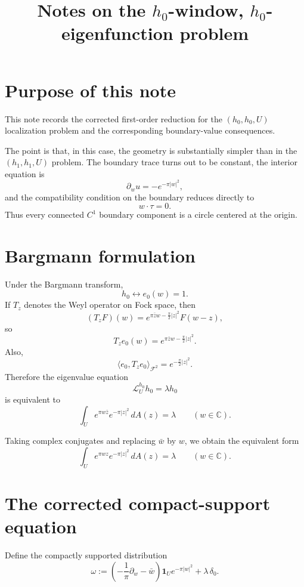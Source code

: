 \documentclass[11pt]{article}
\title{Notes on the \(h_0\)-window, \(h_0\)-eigenfunction problem}
\author{}
\date{}
\newcommand{\C}{\mathbb C}
\newcommand{\1}{\mathbf 1}
\newcommand{\pw}{\partial_w}
\begin{document}
\maketitle

\section{Purpose of this note}

This note records the corrected first-order reduction for the \((h_0,h_0,U)\) localization
problem and the corresponding boundary-value consequences.

The point is that, in this case, the geometry is substantially simpler than in the
\((h_1,h_1,U)\) problem. The boundary trace turns out to be constant, the interior equation is
\[
\pw u=-e^{-\pi|w|^2},
\]
and the compatibility condition on the boundary reduces directly to
\[
w\cdot \tau=0.
\]
Thus every connected \(C^1\) boundary component is a circle centered at the origin.

\section{Bargmann formulation}

Under the Bargmann transform,
\[
h_0 \longleftrightarrow e_0(w)=1.
\]
If \(T_z\) denotes the Weyl operator on Fock space, then
\[
(T_zF)(w)=e^{\pi \bar z w-\frac{\pi}{2}|z|^2}F(w-z),
\]
so
\[
T_ze_0(w)=e^{\pi \bar z w-\frac{\pi}{2}|z|^2}.
\]
Also,
\[
\langle e_0,T_ze_0\rangle_{\mathcal F^2}=e^{-\frac{\pi}{2}|z|^2}.
\]
Therefore the eigenvalue equation
\[
\mathcal L_U^{h_0}h_0=\lambda h_0
\]
is equivalent to
\begin{equation}\label{eq:bargmann-h0}
\int_U e^{\pi w\bar z}e^{-\pi|z|^2}\,dA(z)=\lambda
\qquad (w\in \C).
\end{equation}

Taking complex conjugates and replacing \(\bar w\) by \(w\), we obtain the equivalent form
\begin{equation}\label{eq:bargmann-h0-conjugated}
\int_U e^{\pi wz}e^{-\pi|z|^2}\,dA(z)=\lambda
\qquad (w\in \C).
\end{equation}

\section{The corrected compact-support equation}

Define the compactly supported distribution
\begin{equation}\label{eq:def-omega}
\omega:=
\left(-\frac{1}{\pi}\pw-\bar w\right)\!\1_U e^{-\pi|w|^2}
+\lambda\,\delta_0.
\end{equation}
\end{document}

